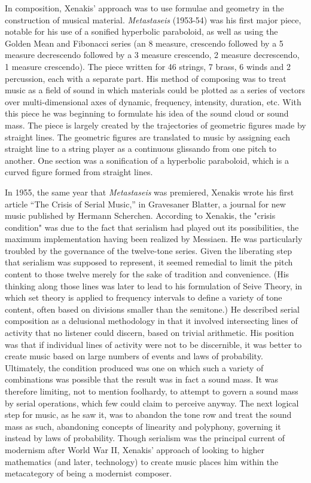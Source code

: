 In composition, Xenakis' approach was to use formulae and geometry in the construction of musical material. \textit{Metastaseis} (1953-54) was his first major piece, notable for his use of a sonified hyperbolic paraboloid, as well as using the Golden Mean and Fibonacci series (an 8 measure, crescendo followed by a 5 measure decrescendo followed by a 3 measure crescendo, 2 measure decrescendo, 1 measure crescendo). The piece written for 46 strings, 7 brass, 6 winds and 2 percussion, each with a separate part. His method of composing was to treat music as a field of sound in which materials could be plotted as a series of vectors over multi-dimensional axes of dynamic, frequency, intensity, duration, etc. With this piece he was beginning to formulate his idea of the sound cloud or sound mass. The piece is largely created by the trajectories of geometric figures made by straight lines. The geometric figures are translated to music by assigning each straight line to a string player as a continuous glissando from one pitch to another. One section was a sonification of a hyperbolic paraboloid, which is a curved figure formed from straight lines.

In 1955, the same year that \textit{Metastaseis} was premiered, Xenakis wrote his first article ``The Crisis of Serial Music,'' in Gravesaner Blatter, a journal for new music published by Hermann Scherchen. According to Xenakis, the "crisis condition" was due to the fact that serialism had played out its possibilities, the maximum implementation having been realized by Messiaen. He was particularly troubled by the governance of the twelve-tone series. Given the liberating step that serialism was supposed to represent, it seemed remedial to limit the pitch content to those twelve merely for the sake of tradition and convenience. (His thinking along those lines was later to lead to his formulation of Seive Theory, in which set theory is applied to frequency intervals to define a variety of tone content, often based on divisions smaller than the semitone.) He described serial composition as a delusional methodology in that it involved intersecting lines of activity that no listener could discern, based on trivial arithmetic. His position was that if individual lines of activity were not to be discernible, it was better to create music based on large numbers of events and laws of probability. Ultimately, the condition produced was one on which such a variety of combinations was possible that the result was in fact a sound mass. It was therefore limiting, not to mention foolhardy, to attempt to govern a sound mass by serial operations, which few could claim to perceive anyway. The next logical step for music, as he saw it, was to abandon the tone row and treat the sound mass as such, abandoning concepts of linearity and polyphony, governing it instead by laws of probability. Though serialism was the principal current of modernism after World War II, Xenakis' approach of looking to higher mathematics (and later, technology) to create music places him within the metacategory of being a modernist composer.

